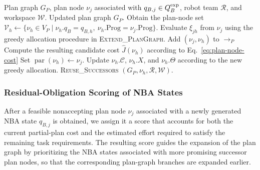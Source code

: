 \documentclass[lettersize,journal]{IEEEtran}
\theoremstyle{italiclemma}
\theoremstyle{italiclemma}
\theoremstyle{definition}
\begin{document}
\begin{algorithm}[H]
\caption{\textsc{Reuse\_Successors}}
\label{alg:reuse_successors}
\begin{algorithmic}[1]
\REQUIRE Plan graph $G_P$, plan node $\nu_j$ associated with $q_{B,j}\in Q_B^{\rm exp}$, robot team $\mathcal R$, and workspace $\mathcal W$.
\ENSURE Updated plan graph \(G_P\).
     \STATE Obtain the plan-node set $\mathcal V_h \gets \{\nu_h\in V_P \mid \nu_h.q_B=q_{B,h},\ \nu_h.\mathrm{Prog}= \nu_j.\mathrm{Prog}\}.$
        \STATE Evaluate $\xi_{jh}$ from $\nu_j$ using the greedy allocation procedure in \textsc{Extend\_PlanGraph}.
            \STATE {}
        \ENDIF
        \STATE Add $(\nu_j,\nu_h)$ to $\rightarrow_P$
        \STATE Compute the resulting candidate cost
$\widehat J(\nu_h)$ according to Eq.~\ref{eq:plan-node-cost}
    \STATE Set $\operatorname{par}(\nu_h)\gets\nu_j$.
    \STATE Update $\nu_h.\mathcal C$, $\nu_h.X$, and
    $\nu_h.\Theta$ according to the new greedy allocation.
    \STATE \textsc{Reuse\_Successors}
    $(G_P,\nu_h,\mathcal R,\mathcal W)$.
\ENDIF
\ENDFOR
\ENDFOR
\end{algorithmic}
\end{algorithm}


\subsubsection{Residual-Obligation Scoring of NBA States}
\label{subsec:residual_score}
After a feasible nonaccepting plan node $\nu_j$ associated with a newly generated NBA state $q_{B,j}$ is obtained, we assign it a score that accounts for both the current partial-plan cost and the estimated effort required to satisfy the remaining task requirements. The resulting score guides the expansion of the plan graph by prioritizing the NBA states associated with more promising successor plan nodes, so that the corresponding plan-graph branches are expanded earlier.
\end{document}
